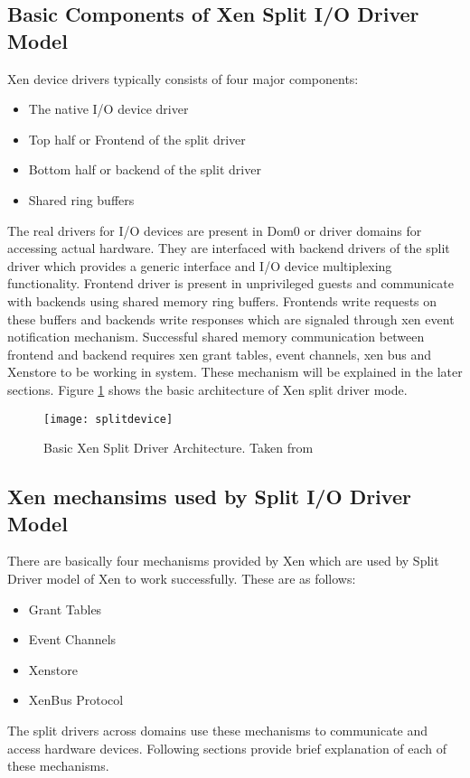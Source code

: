 \subsection{Basic Components of Xen Split I/O Driver Model\label{sec:basiccomp}}
Xen device drivers typically consists of four major components:
\begin{itemize}
	\item The native I/O device driver
	\item Top half or Frontend of the split driver
	\item Bottom half or backend of the split driver
	\item Shared ring buffers
\end{itemize}

The real drivers for I/O devices are present in Dom0 or driver domains for accessing actual hardware. They are interfaced with backend drivers of the split driver which provides a generic interface and I/O device multiplexing functionality. Frontend driver is present in unprivileged guests and communicate with backends using shared memory ring buffers. Frontends write requests on these buffers and backends write responses which are signaled through xen event notification mechanism. Successful shared memory communication between frontend and backend requires xen grant tables, event channels, xen bus and Xenstore to be working in system. These mechanism will be explained in the later sections. Figure \ref{splitdevice} shows the basic architecture of Xen split driver mode.
\begin{figure}[!htbp]
	\centering
	\texttt{[image: splitdevice]}
	\caption{Basic Xen Split Driver Architecture. Taken from \cite{xen_slides}}
	\label{splitdevice}
\end{figure}

\subsection{Xen mechansims used by Split I/O Driver Model\label{sec:basicmech}}
There are basically four mechanisms provided by Xen which are used by Split Driver model of Xen to work successfully. These are as follows:
\begin{itemize}
	\item Grant Tables
	\item Event Channels
    \item Xenstore
	\item XenBus Protocol
\end{itemize}
The split drivers across domains use these mechanisms to communicate and access hardware devices. Following sections provide brief explanation of each of these mechanisms.
